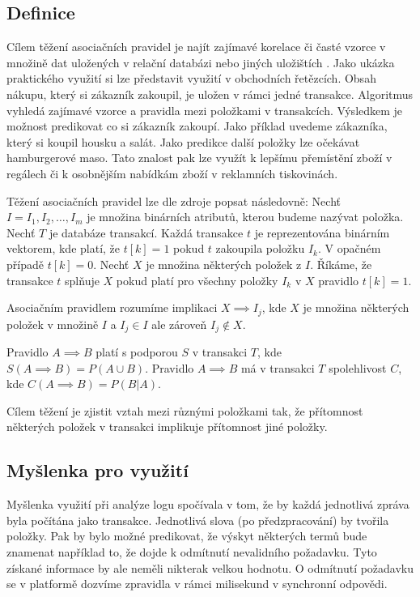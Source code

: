\documentclass[thesis=M,czech]{FITthesis}[2012/10/20]
\begin{document}
		\subsection{Definice}
		Cílem těžení asociačních pravidel je najít zajímavé korelace či časté vzorce v množině dat uložených v relační databázi nebo jiných uložištích \cite{assoc1}. Jako ukázka praktického využití si lze představit využití v obchodních řetězcích. Obsah nákupu, který si zákazník zakoupil, je uložen v rámci jedné transakce. Algoritmus vyhledá zajímavé vzorce a pravidla mezi položkami v transakcích. Výsledkem je možnost predikovat co si zákazník zakoupí. Jako příklad uvedeme zákazníka, který si koupil housku a salát. Jako predikce další položky lze očekávat hamburgerové maso. Tato znalost pak lze využít k lepšímu přemístění zboží v regálech či k osobnějším nabídkám zboží v reklamních tiskovinách.
		
		Těžení asociačních pravidel lze dle zdroje \cite{AsocAgrawal1} popsat následovně: Nechť $I = I_1, I_2,\ldots,I_m$ je množina binárních atributů, kterou budeme nazývat položka. Nechť $T$ je databáze transakcí. Každá transakce $t$ je reprezentována binárním vektorem, kde platí, že $t[k] = 1$ pokud $t$ zakoupila položku $I_k$. V opačném případě $t[k] = 0$. Nechť $X$  je množina některých položek z $I$. Říkáme, že transakce $t$ splňuje $X$ pokud platí pro všechny položky $I_k$ v $X$ pravidlo $t[k] = 1$.	
			
		Asociačním pravidlem rozumíme implikaci $X \implies I_j$, kde $X$ je množina některých položek v množině $I$ a $I_j \in I$ ale zároveň $I_j \notin X$.
		
		Pravidlo $A \implies B$ platí s podporou $S$ v transakci $T$, kde $S(A \implies B) = P(A \cup B)$. Pravidlo $A \implies B$ má v transakci $T$ spolehlivost $C$, kde $C(A \implies B) = P(B|A)$.
		
		Cílem těžení je zjistit vztah mezi různými položkami tak, že přítomnost některých položek v transakci implikuje přítomnost jiné položky.
		
		\subsection{Myšlenka pro využití}
		Myšlenka využití při analýze logu spočívala v tom, že by každá jednotlivá zpráva byla počítána jako transakce. Jednotlivá slova (po předzpracování) by tvořila položky. Pak by bylo možné predikovat, že výskyt některých termů bude znamenat například to, že dojde k odmítnutí nevalidního požadavku. Tyto získané informace by ale neměli nikterak velkou hodnotu. O odmítnutí požadavku se v platformě dozvíme zpravidla v rámci milisekund v synchronní odpovědi.
		
\end{document}

